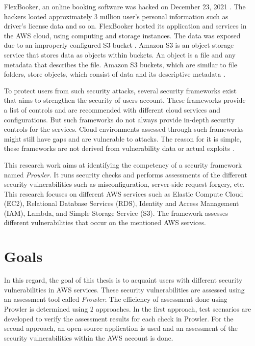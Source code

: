 \par FlexBooker, an online booking software was hacked on December 23, 2021 \cite{6}\cite{7}. The hackers looted approximately 3 million user's personal information such as driver's license data and so on. FlexBooker hosted its application and services in the AWS cloud, using computing and storage instances. The data was exposed due to an improperly configured S3 bucket \cite{8}. Amazon S3 is an object storage service that stores data as objects within buckets. An object is a file and any metadata that describes the file. Amazon S3 buckets, which are similar to file folders, store objects, which consist of data and its descriptive metadata \cite{9}.



\par  To protect users from such security attacks, several security frameworks exist that aims to strengthen the
security of users account. These frameworks provide a list of controls and are recommended with different cloud services and
configurations. But such frameworks do not always provide in-depth security controls for the services. Cloud
environments assessed through such frameworks might still have gaps and are vulnerable to attacks. The reason for it
is simple, these frameworks are not derived from vulnerability data or actual exploits \cite{10}.

\par This research work aims at identifying the competency of a security framework named \textit{Prowler}. It runs security checks and performs assessments of the different security vulnerabilities such as misconfiguration,
server-side request forgery, etc. This research focuses on different AWS services such as Elastic Compute Cloud (EC2), Relational Database Services (RDS), Identity and Access Management (IAM), Lambda, and Simple Storage Service (S3). The framework assesses different vulnerabilities that occur on the mentioned AWS services.



\section{Goals}
\par In this regard, the goal of this thesis is to acquaint users with different security vulnerabilities in AWS
services. These security vulnerabilities are assessed using an assessment tool called \textit{Prowler}. The
efficiency of assessment done using Prowler is determined using 2 approaches. In the first approach, test scenarios
are developed to verify the assessment results for each check in Prowler. For the second approach, an open-source
application is used and an assessment of the security vulnerabilities within the AWS account is done.

